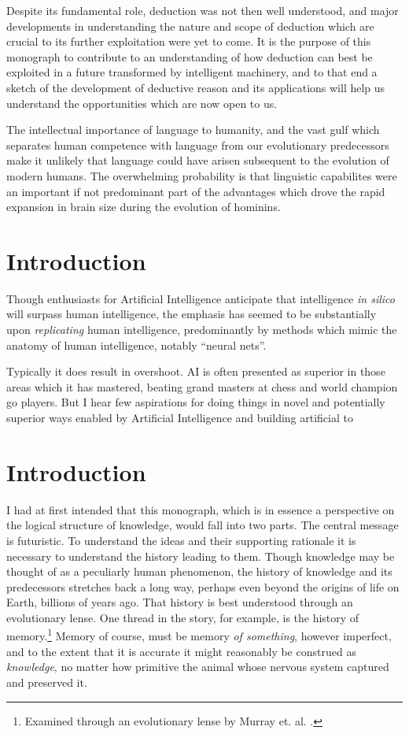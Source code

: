 \documentclass[10pt,titlepage]{book}
\begin{document}
Despite its fundamental role, deduction was not then well understood, and major developments in understanding the nature and scope of deduction which are crucial to its further exploitation were yet to come.
It is the purpose of this monograph to contribute to an understanding of how deduction can best be exploited in a future transformed by intelligent machinery, and to that end a sketch of the development of deductive reason and its applications will help us understand the opportunities which are now open to us.

The intellectual importance of language to humanity, and the vast gulf which separates human competence with language from our evolutionary predecessors make it unlikely that language could have arisen subsequent to the evolution of modern humans.
The overwhelming probability is that linguistic capabilites were an important if not predominant part of the advantages which drove the rapid expansion in brain size during the evolution of hominins.



\chapter{Introduction}

Though enthusiasts for Artificial Intelligence anticipate that intelligence \emph{in silico} will surpass human intelligence, the emphasis has seemed to be substantially upon \emph{replicating} human intelligence, predominantly by methods which mimic the anatomy of human intelligence, notably ``neural nets''.

Typically it does result in overshoot.
AI is often presented as superior in those areas which it has mastered, beating grand masters at chess and world champion go players.
But I hear few aspirations for doing things in novel and potentially superior ways enabled by Artificial Intelligence and building artificial to 



\chapter{Introduction}

I had at first intended that this monograph, which is in essence a perspective on the logical structure of knowledge, would fall into two parts.
The central message is futuristic.
To understand the ideas and their supporting rationale it is necessary to understand the history leading to them.
Though knowledge may be thought of as a peculiarly human phenomenon, the history of knowledge and its predecessors stretches back a long way, perhaps even beyond the origins of life on Earth, billions of years ago.
That history is best understood through an evolutionary lense.
One thread in the story, for example, is the history of memory.\footnote{Examined through an evolutionary lense by Murray et. al. \cite{murray2017evolution}.}
Memory of course, must be memory \emph{of something}, however imperfect, and to the extent that it is accurate it might reasonably be construed as \emph{knowledge}, no matter how primitive the animal whose nervous system captured and preserved it.
\end{document}
